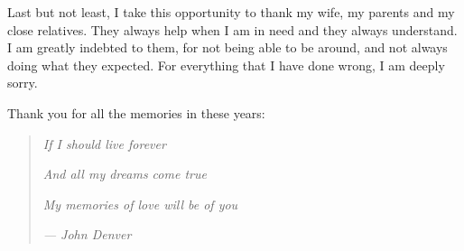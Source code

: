 \begin{acknowledgements}
Last but not least, I take this opportunity to thank my wife, my parents and my close relatives. They always help when I am in need and they always understand. I am greatly indebted to them, for not being able to be around, and not always doing what they expected. For everything that I have done wrong, I am deeply sorry.

Thank you for all the memories in these years:
\begin{quote}
\centering
\textit{If I should live forever}

\textit{And all my dreams come true}

\textit{My memories of love will be of you}

\textit{--- John Denver}
\end{quote}

\end{acknowledgements}




